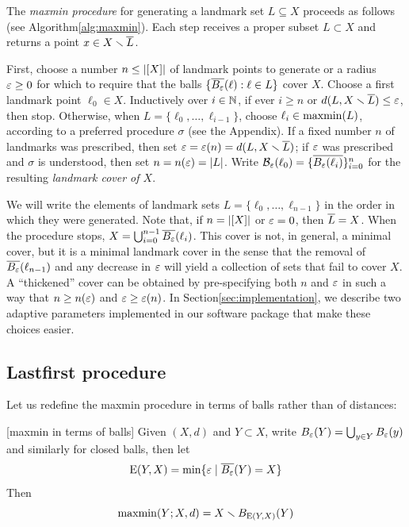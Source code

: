 \documentclass[
]{article}
\begin{document}
The \emph{maxmin procedure} for generating a landmark set
\(L\subseteq X\) proceeds as follows (see
Algorithm\nbs\ref{alg:maxmin}). Each step receives a proper subset
\(L\subset X\) and returns a point \(x\in X\smallsetminus \overline{L}\).

First, choose a number \(n\leq\lvert [X]\rvert\) of landmark points to generate
or a radius \(\varepsilon\geq 0\) for which to require that the balls
\(\{ \overline{B_{\varepsilon}}(\ell) : \ell \in L \}\) cover \(X\). Choose a first
landmark point \(\ell_0\in X\). Inductively over \(i\in\mathbb{N}\), if ever
\(i\geq n\) or \(d(L,X\smallsetminus \overline{L})\leq\varepsilon\), then stop. Otherwise, when
\(L=\{\ell_0,\ldots,\ell_{i-1}\}\), choose \(\ell_i\in\operatorname{maxmin}(L)\),
according to a preferred procedure \(\sigma\) (see the Appendix). If a
fixed number \(n\) of landmarks was prescribed, then set
\(\varepsilon=\varepsilon(n)=d(L,X\smallsetminus \overline{L})\); if \(\varepsilon\) was prescribed and
\(\sigma\) is understood, then set \(n=n(\varepsilon)=\lvert L\rvert\). Write
\(\mathcal{B}_\varepsilon(\ell_0)=\{\overline{B_{\varepsilon}(\ell_i)}\}_{i=0}^{n}\) for the
resulting \emph{landmark cover of $X$}.

We will write the elements of landmark sets
\(L=\{\ell_0,\ldots,\ell_{n-1}\}\) in the order in which they were
generated. Note that, if \(n=\lvert [X]\rvert\) or \(\varepsilon=0\), then
\(\overline{L}=X\). When the procedure stops,
\(X=\bigcup_{i=0}^{n-1}{\overline{B_{\varepsilon}}(\ell_i)}\). This cover is not, in
general, a minimal cover, but it is a minimal landmark cover in the
sense that the removal of \(\overline{B_\varepsilon}(\ell_{n-1})\) and any decrease
in \(\varepsilon\) will yield a collection of sets that fail to cover \(X\). A
``thickened'' cover can be obtained by pre-specifying both \(n\) and
\(\varepsilon\) in such a way that \(n \geq n(\varepsilon)\) and
\(\varepsilon \geq \varepsilon(n)\). In Section\nbs\ref{sec:implementation}, we
describe two adaptive parameters implemented in our software package
that make these choices easier.

\hypertarget{lastfirst-procedure}{%
\subsection{Lastfirst procedure}\label{lastfirst-procedure}}

Let us redefine the maxmin procedure in terms of balls rather than of
distances:

\begin{proposition}\label{prop:maxmin}[maxmin in terms of balls]
Given $(X,d)$ and $Y \subset X$, write $B_\varepsilon(Y) = \bigcup_{y \in Y}{B_\varepsilon(y)}$ and similarly for closed balls, then let
$${\mathrm{E}}(Y,X) = \min\{ \varepsilon \mid \overline{B_\varepsilon}(Y) = X \}$$
Then
$$\operatorname{maxmin}(Y;X,d) = X \smallsetminus B_{{\mathrm{E}}(Y,X)}(Y)$$
\end{proposition}
\end{document}

